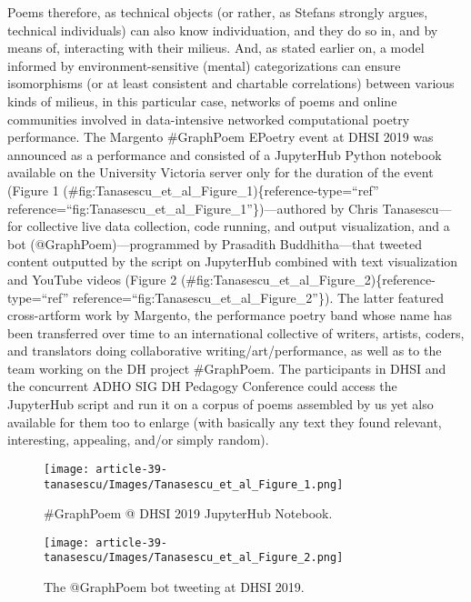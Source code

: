 Poems therefore, as technical objects (or rather, as Stefans strongly
argues, technical individuals) can also know individuation, and they do
so in, and by means of, interacting with their milieus. And, as stated
earlier on, a model informed by environment-sensitive (mental)
categorizations can ensure isomorphisms (or at least consistent and
chartable correlations) between various kinds of milieus, in this
particular case, networks of poems and online communities involved in
data-intensive networked computational poetry performance. The Margento
\#GraphPoem EPoetry event at DHSI 2019 was announced as a performance
and consisted of a JupyterHub Python notebook available on the
University Victoria server only for the duration of the event (Figure
{1} (\#fig:Tanasescu\_et\_al\_Figure\_1)\{reference-type=``ref''
reference=``fig:Tanasescu\_et\_al\_Figure\_1''\})---authored by Chris
Tanasescu---for collective live data collection, code running, and
output visualization, and a bot (@GraphPoem)---programmed by Prasadith
Buddhitha---that tweeted content outputted by the script on JupyterHub
combined with text visualization and YouTube videos (Figure {2}
(\#fig:Tanasescu\_et\_al\_Figure\_2)\{reference-type=``ref''
reference=``fig:Tanasescu\_et\_al\_Figure\_2''\}). The latter featured
cross-artform work by Margento, the performance poetry band whose name
has been transferred over time to an international collective of
writers, artists, coders, and translators doing collaborative
writing/art/performance, as well as to the team working on the DH
project \#GraphPoem. The participants in DHSI and the concurrent ADHO
SIG DH Pedagogy Conference could access the JupyterHub script and run it
on a corpus of poems assembled by us yet also available for them too to
enlarge (with basically any text they found relevant, interesting,
appealing, and/or simply random).

\begin{figure}
\hypertarget{fig:Tanasescu_et_al_Figure_1}{%
\centering
\texttt{[image: article-39-tanasescu/Images/Tanasescu\_et\_al\_Figure\_1.png]}
\caption{\#GraphPoem @ DHSI 2019 JupyterHub
Notebook.{}}\label{fig:Tanasescu_et_al_Figure_1}
}
\end{figure}

\begin{figure}
\hypertarget{fig:Tanasescu_et_al_Figure_2}{%
\centering
\texttt{[image: article-39-tanasescu/Images/Tanasescu\_et\_al\_Figure\_2.png]}
\caption{The @GraphPoem bot tweeting at DHSI
2019.{}}\label{fig:Tanasescu_et_al_Figure_2}
}
\end{figure}


